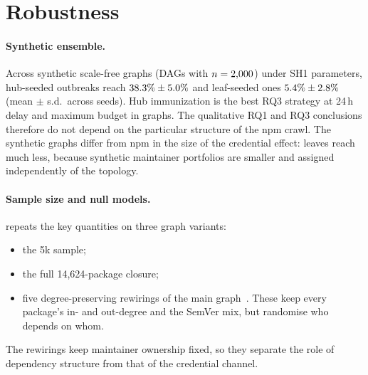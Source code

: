 \section{Robustness}\label{sec:robustness}

\paragraph{Synthetic ensemble.}
Across \SynSeeds{} synthetic scale-free graphs (DAGs with $n=2{,}000$) under SH1 parameters, hub-seeded
outbreaks reach $38.3\%\pm5.0\%$ and leaf-seeded ones $5.4\%\pm2.8\%$ (mean
$\pm$ s.d.\ across seeds). Hub immunization is the best RQ3 strategy at 24\,h delay and maximum budget
in \SynRQThreeBestCount{} graphs. The qualitative RQ1 and RQ3 conclusions therefore do not depend on the
particular structure of the npm crawl. The synthetic graphs differ from npm in the size of the credential
effect: leaves reach much less, because synthetic maintainer portfolios are smaller and assigned
independently of the topology.

\paragraph{Sample size and null models.}
 repeats the key quantities on three graph variants:
\begin{itemize}
  \item the 5k sample;
  \item the full 14{,}624-package closure;
  \item five degree-preserving rewirings of the main graph~\citep{maslov2002specificity}. These keep every
        package's in- and out-degree and the SemVer mix, but randomise who depends on whom.
\end{itemize}
The rewirings keep maintainer ownership fixed, so they separate the role of dependency structure from
that of the credential channel.

\begin{table}[t]
\centering
\caption{Robustness of the key quantities across graph variants. $\Rinf$ values are means over 1{,}000
runs per origin group.}
\label{tab:robustness}
\small

\end{table}

